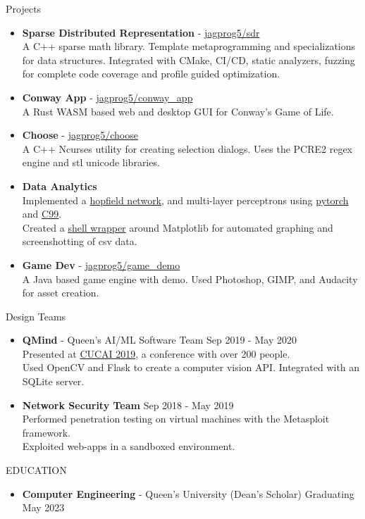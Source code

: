 \documentclass{resume} %
\begin{document}
\begin{rSection}{Projects}
    \begin{itemize}
        \item {\bf Sparse Distributed Representation} - \href{https://github.com/jagprog5/SDR/}{jagprog5/sdr}\\
        A C++ sparse math library. Template metaprogramming and specializations for data structures. Integrated with CMake, CI/CD, static analyzers, fuzzing for complete code coverage and profile guided optimization.
        \item {\bf Conway App} - \href{https://github.com/jagprog5/conway_app/}{jagprog5/conway\_app}\\
        A Rust WASM based web and desktop GUI for Conway's Game of Life.
        \item {\bf Choose} - \href{https://github.com/jagprog5/choose/}{jagprog5/choose}\\
        A C++ Ncurses utility for creating selection dialogs.
        Uses the PCRE2 regex engine and stl unicode libraries.
        \item {\bf Data Analytics}\\
        Implemented a \href{https://github.com/jagprog5/hopfield}{hopfield network}, and multi-layer perceptrons using \href{https://github.com/jagprog5/mlp}{pytorch} and \href{https://github.com/jagprog5/CNeuralNet}{C99}.\\
        Created a \href{https://github.com/jagprog5/CSV-Plotter}{shell wrapper} around Matplotlib for automated graphing and screenshotting of csv data. 
        \item {\bf Game Dev} - \href{https://github.com/jagprog5/GameDemo}{jagprog5/game\_demo}\\
        A Java based game engine with demo. Used Photoshop, GIMP, and Audacity for asset creation.
    \end{itemize}
\end{rSection}

\begin{rSection}{Design Teams}
    \begin{itemize}
        \item {\bf QMind} - Queen's AI/ML Software Team \hfill {Sep 2019 - May 2020}\\
        Presented at \href{https://medium.com/qmind-ai/cucai2019-c9d5f848f5c}{CUCAI 2019}, a conference with over 200 people.\\
        Used OpenCV and Flask to create a computer vision API.
        Integrated with an SQLite server.
        \item {\bf Network Security Team} \hfill {Sep 2018 - May 2019}\\
        Performed penetration testing on virtual machines with the Metasploit framework.\\
        Exploited web-apps in a sandboxed environment.
\end{itemize}
\end{rSection}

\begin{rSection}{EDUCATION}
    \begin{itemize}
        \item {\bf Computer Engineering} - Queen's University (Dean's Scholar) \hfill {Graduating May 2023}
    \end{itemize}
\end{rSection}
\end{document}
